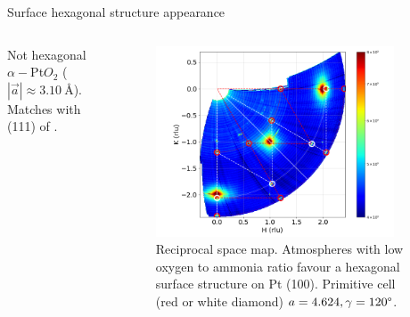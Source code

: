 \begin{frame}{Surface hexagonal structure appearance}
\begin{columns}
    Not hexagonal $\alpha-$Pt$O_2$ ($|\Vec{a}| \approx \SI{3.10}{\angstrom}$). Matches with (111) of \ptthreeofour.
    
    
    \begin{figure}
        \centering

        \includegraphics[trim=40 0 40 0, clip, width=0.9\textwidth]{Figures/sxrd_data/maps/Map_hkl_surf_or_2227-2283.png}
        \caption{Reciprocal space map. Atmospheres with low oxygen to ammonia ratio favour a hexagonal surface structure on Pt (100). Primitive cell (red or white diamond) $a=4.624, \gamma=120\degree$.}

        \label{fig:CondB}
    \end{figure}
    
    \end{columns}

\end{frame}
